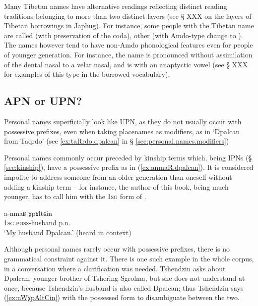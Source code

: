 Many Tibetan names have alternative readings reflecting distinct reading traditions belonging to more than two distinct layers (see § XXX on the layers of Tibetan borrowings in Japhug). For instance, some people with the Tibetan name  are called  (with preservation of the coda), other  (with Amdo-type change to ). The names however tend to have non-Amdo phonological features even for people of younger generation. For instance, the name  is pronounced  without assimilation of the dental nasal to a velar nasal, and   is  with an anaptyctic vowel (see § XXX for examples of this type in the borrowed vocabulary).  


 

\subsection{APN or UPN?} \label{sec:personal.name.APN}
Personal names superficially look like UPN, as they do not usually occur with possessive prefixes, even when taking placenames as modifiers, as in  `Dpalcan from Taqrdo' (see \ref{ex:taRrdo.dpalcan} in § \ref{sec:personal.names.modifiers})

Personal names commonly occur preceded by kinship terms which, being IPNs (§ \ref{sec:kinship}), have a possessive prefix as in (\ref{ex:anmaR.dpalcan}). It is considered impolite to address someone from an older generation than oneself without adding a kinship term -- for instance, the author of this book, being much younger, has to call him  with the \textsc{1sg} form of .

\begin{exe}
\ex \label{ex:anmaR.dpalcan}
\gll a-nmaʁ χpɤltɕin \\
\textsc{1sg}.\textsc{poss}-husband p.n. \\
\glt `My husband Dpalcan.' (heard in context)
\end{exe}

Although personal names rarely occur with possessive prefixes, there is no grammatical constraint against it. There is one such example in the whole corpus, in a conversation where a clarification was needed. Tshendzin asks about Dpalcan, younger brother of Tshering Sgrolma, but she does not understand at once, because Tshendzin's husband is also called Dpalcan; thus Tshendzin says (\ref{ex:nWχpAltCin}) with the possessed form  to disambiguate between the two. 

